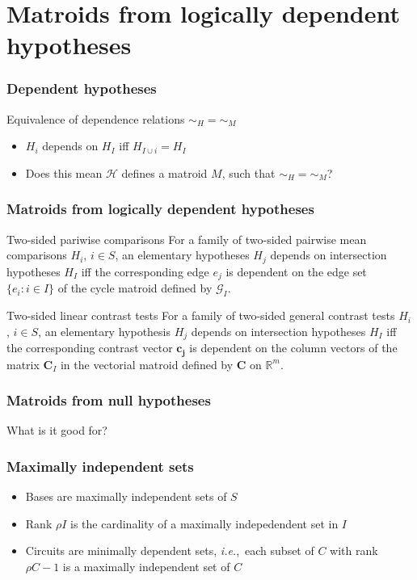 \documentclass[bigger]{beamer}
\newcommand{\bs}[1]{\bm{#1}}
\newcommand{\ie}{{\em i.e.},~}
\begin{document}
\section{Matroids from logically dependent hypotheses}
\begin{frame}
  \frametitle{Dependent hypotheses}
  \begin{block}{Equivalence of dependence relations $\sim_H = \sim_M$}
    \begin{itemize}
    \item<1-> $H_i$ depends on $H_I$ iff $H_{I \cup i} = H_{I}$
    \item<2-> Does this mean $\mathscr{H}$ defines a matroid $M$, such that
      $\sim_H = \sim_M$?
    \end{itemize}
  \end{block}
\end{frame}



\begin{frame}
\frametitle{Matroids from logically dependent hypotheses}

  \begin{block}{Two-sided pariwise comparisons}
    For a family of two-sided pairwise mean comparisons $H_i$, $i \in
    S$, an elementary hypotheses $H_j$ depends on intersection
    hypotheses $H_I$ iff the corresponding edge $e_j$ is dependent on
    the edge set $\{e_i:i \in I\}$ of the cycle matroid defined by 
    $\mathscr{G}_I$.   
  \end{block}

  \begin{block}{Two-sided linear contrast tests}
    For a family of two-sided general contrast tests $H_i$, $i \in S$,
    an elementary hypothesis $H_j$ depends on intersection hypotheses
    $H_I$ iff the corresponding contrast vector $\bs{c_j}$ is
    dependent on the column vectors of the matrix $\bs{C}_I$ in the
    vectorial matroid defined by $\bs{C}$ on $\mathbb{R}^m$.
  \end{block}

\end{frame}


\begin{frame}
  \frametitle{Matroids from null hypotheses}
  {\Large What is it good for?\\
  }
\end{frame}

\begin{frame}
\frametitle{Maximally independent sets}
  \begin{itemize}
  \item Bases are maximally independent sets of $S$
  \item Rank $\rho I$ is the cardinality of a maximally indepedendent set in $I$
  \item Circuits are minimally dependent sets, \ie each subset of $C$
    with rank $\rho C - 1$ is a maximally independent set of $C$
  \end{itemize}
\end{frame}
\end{document}

